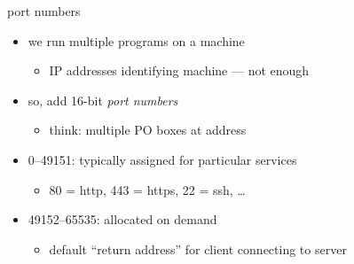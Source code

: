 \begin{frame}{port numbers}
    \begin{itemize}
    \item we run multiple programs on a machine
        \begin{itemize}
        \item IP addresses identifying machine --- not enough
        \end{itemize}
    \item<2-> so, add 16-bit \textit{port numbers}
        \begin{itemize}
        \item<2-> think: multiple PO boxes at address
        \end{itemize}
    \vspace{.5cm}
    \item<3-> 0--49151: typically assigned for particular services
        \begin{itemize}
        \item 80 = http, 443 = https, 22 = ssh, \ldots
        \end{itemize}
    \item<3-> 49152--65535: allocated on demand
        \begin{itemize}
        \item default ``return address'' for client connecting to server
        \end{itemize}
    \end{itemize}
\end{frame}


